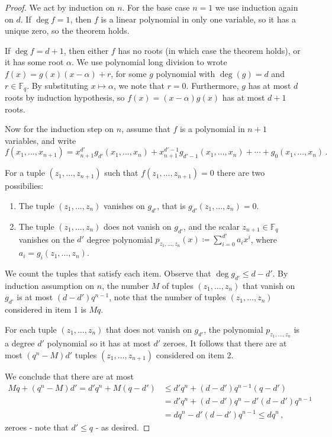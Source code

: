 \documentclass[12pt]{amsart}
\theoremstyle{definition}
\newcommand{\F}{\mathbb{F}}
\begin{document}
\begin{proof}
We act by induction on $n$.
For the base case $n = 1$ we use induction again on $d$.
If $\deg f = 1$, then $f$ is a linear polynomial in only one variable, so it has a unique zero, so the theorem holds.

If $\deg f = d+1$, then either $f$ has no roots (in which case the theorem holds), or it has some root $\alpha$.
We use polynomial long division to wrote $f(x) = g(x) (x-\alpha) + r$, for some $g$ polynomial with $\deg(g) = d$ and $r \in \F_q$.
By substituting $x \mapsto \alpha$, we note that $r = 0$.
Furthermore, $g$ has at most $d$ roots by induction hypothesis, so $f(x) = (x-\alpha) g(x) $ has at most $d+1$ roots.

Now for the induction step on $n$, assume that $f$ is a polynomial in $n+1$ variables, and write
$$ f(x_1, \ldots, x_{n+1} ) = x_{n+1}^{d'} g_{d'}(x_1, \ldots, x_n) + x_{n+1}^{d'-1} g_{d'-1}(x_1, \ldots, x_n) + \cdots + g_0(x_1, \ldots, x_n)\, . $$

For a tuple $(z_1, \ldots, z_{n+1})$ such that $f(z_1, \ldots, z_{n+1}) = 0$ there are two possibilies:
\begin{enumerate}
\item The tuple $(z_1, \ldots, z_{n})$ vanishes on $g_{d'}$, that is $g_{d'}(z_1, \ldots, z_{n}) = 0$.

\item The tuple $(z_1, \ldots, z_{n})$ does not vanish on $g_{d'}$, and the scalar $z_{n+1} \in \F_q$ vanishes on the $d'$ degree polynomial $p_{z_1, \ldots, z_{n}}(x) \coloneqq \sum_{i=0}^{d'} a_i x^i$, where $a_i = g_{i}(z_1, \ldots, z_n)$.
\end{enumerate}

We count the tuples that satisfy each item.
Observe that $\deg g_{d'} \leq d - d'$.
By induction assumption on $n$, the number $M$ of tuples $(z_1, \ldots, z_{n})$ that vanish on $g_{d'}$ is at most $(d - d')q^{n-1}$, note that the number of tuples $(z_1, \ldots, z_{n})$ considered in item 1 is $ M q$.

For each tuple $(z_1, \ldots, z_{n})$ that does not vanish on $g_{d'}$, the polynomial $p_{z_1, \ldots, z_{n}}$ is a degree $d'$ polynomial so it has at most $d'$ zeroes.
It follows that there are at most $(q^n - M)d'$ tuples $(z_1, \ldots, z_{n+1})$ considered on item 2.

We conclude that there are at most 
\begin{align*}
M q + (q^n - M)d' = d' q^n + M(q - d')&\leq d'q^n + (d - d')q^{n-1}(q - d') \\
 &= d' q^n + (d - d')q^{n} - d'(d-d')q^{n-1} \\
 &= d q^n - d'(d-d')q^{n-1} \leq d q^n \, ,
\end{align*}
 zeroes - note that $d' \leq q$ - as desired.
\end{proof}
\end{document}
